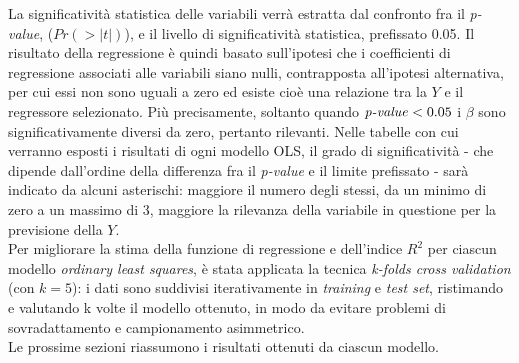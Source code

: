 \documentclass[fleqn,10pt]{SelfArx} %
\begin{document}
La significatività statistica delle variabili verrà estratta dal confronto fra il \textit{p-value}, ($Pr(>|t|)$), e il livello di significatività statistica, prefissato 0.05. Il risultato della regressione è quindi basato sull’ipotesi che i coefficienti di regressione associati alle variabili siano nulli, contrapposta all'ipotesi alternativa, per cui essi non sono uguali a zero ed esiste cioè una relazione tra la $Y$ e il regressore selezionato. Più precisamente, soltanto quando $\text{\textit{p-value}} < 0.05$ i $\beta$ sono significativamente diversi da zero, pertanto rilevanti. Nelle tabelle con cui verranno esposti i risultati di ogni modello OLS, il grado di significatività - che dipende dall'ordine della differenza fra il \textit{p-value} e il limite prefissato - sarà indicato da alcuni asterischi: maggiore il numero degli stessi, da un minimo di zero a un massimo di 3, maggiore la rilevanza della variabile in questione per la previsione della $Y$.\\
Per migliorare la stima della funzione di regressione e dell'indice $R^2$ per ciascun modello \textit{ordinary least squares}, è stata applicata la tecnica \textit{k-folds cross validation} (con $k=5$): i dati sono suddivisi iterativamente in \textit{training} e \textit{test set}, ristimando e valutando k volte il modello ottenuto, in modo da evitare problemi di sovradattamento e campionamento asimmetrico.\\
Le prossime sezioni riassumono i risultati ottenuti da ciascun modello.
\end{document}
